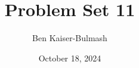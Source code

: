 \documentclass{article}
\title{Problem Set 11}
\author{Ben Kaiser-Bulmash}
\date{October 18, 2024}
\newcommand{\1}{\mathbb{1}}
\begin{document}
\maketitle

\section*{}
\end{document}
